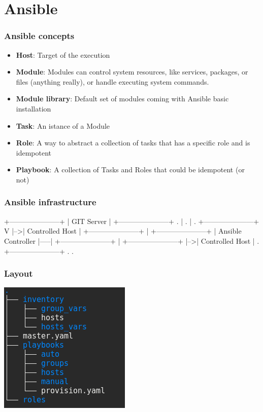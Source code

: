 \documentclass[t,aspectratio=169]{beamer}
\begin{document}
\section{Ansible}
\begin{frame}
    \frametitle{Ansible concepts}
    \begin{itemize}
        \item<2->\textbf{Host}: Target of the execution
        \item<3->\textbf{Module}: Modules can control system resources, like services, packages, or files (anything really), or handle executing system commands.
        \item<4->\textbf{Module library}: Default set of modules coming with Ansible basic installation
        \item<5->\textbf{Task}: An istance of a Module 
        \item<6->\textbf{Role}: A way to abstract a collection of tasks that has a specific role and is idempotent
        \item<7->\textbf{Playbook}: A collection of Tasks and Roles that could be idempotent (or not)
    \end{itemize}
\end{frame}

\begin{frame}[fragile]
    \frametitle{Ansible infrastructure}
    \begin{semiverbatim}
+---------------------+
|     GIT Server      |
+---------------------+     .
           |                .
           |                .   +---------------------+
           V                |-->|   Controlled Host   |
+---------------------+     |   +---------------------+
| Ansible Controller  |-----|
+---------------------+     |   +---------------------+
                            |-->|   Controlled Host   |
                            .   +---------------------+
                            .
                            .
    \end{semiverbatim}
\end{frame}

\begin{frame}
    \frametitle{Layout}
    \begin{center}
        \includegraphics[scale=0.5]{project_structure.png}
    \end{center}
\end{frame}
\end{document}

